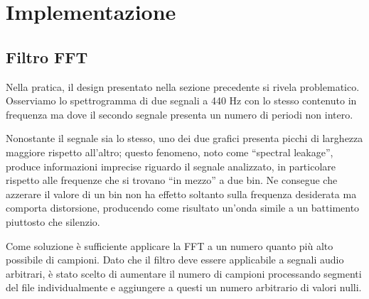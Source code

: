 \section{Implementazione}
\subsection{Filtro FFT}
Nella pratica, il design presentato nella sezione precedente si rivela problematico.
Osserviamo lo spettrogramma di due segnali a 440 Hz con lo stesso contenuto in frequenza ma dove il secondo segnale presenta un numero di periodi non intero.


Nonostante il segnale sia lo stesso, uno dei due grafici presenta picchi di larghezza maggiore rispetto all'altro;
questo fenomeno, noto come ``spectral leakage'', produce informazioni imprecise riguardo il segnale analizzato, in particolare rispetto alle frequenze che si trovano ``in mezzo'' a due bin.
Ne consegue che azzerare il valore di un bin non ha effetto soltanto sulla frequenza desiderata ma comporta distorsione, producendo come risultato un'onda simile a un battimento piuttosto che silenzio.

Come soluzione è sufficiente applicare la FFT a un numero quanto più alto possibile di campioni.
Dato che il filtro deve essere applicabile a segnali audio arbitrari,
è stato scelto di aumentare il numero di campioni processando segmenti del file individualmente e aggiungere a questi un numero arbitrario di valori nulli.

